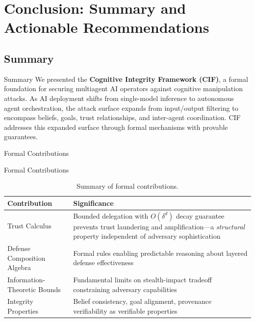 \documentclass[
  ignorenonframetext,
]{beamer}
\author{\texorpdfstring{}{}}
\date{}
\begin{document}
\begin{frame}
\newpage
\end{frame}

\section{Conclusion: Summary and Actionable
Recommendations}\label{conclusion-summary-and-actionable-recommendations}

\subsection{Summary}\label{sec:summary}

\begin{frame}[allowframebreaks]{Summary}
We presented the \textbf{Cognitive Integrity Framework (CIF)}, a formal
foundation for securing multiagent AI operators against cognitive
manipulation attacks. As AI deployment shifts from single-model
inference to autonomous agent orchestration, the attack surface expands
from input/output filtering to encompass beliefs, goals, trust
relationships, and inter-agent coordination. CIF addresses this expanded
surface through formal mechanisms with provable guarantees.
\end{frame}

\begin{frame}[allowframebreaks]{Formal Contributions}
\protect{}\label{formal-contributions}
\end{frame}

\begin{frame}[allowframebreaks]{Formal Contributions}
\begin{table}[htbp]
\centering
\caption{Summary of formal contributions.}
\label{tab:formal-contributions}
\begin{tabular}{@{}lp{8cm}@{}}
\toprule
Contribution & Significance \\
\midrule
Trust Calculus & Bounded delegation with $O(\delta^d)$ decay guarantee prevents trust laundering and amplification---a \textit{structural} property independent of adversary sophistication \\
Defense Composition Algebra & Formal rules enabling predictable reasoning about layered defense effectiveness \\
Information-Theoretic Bounds & Fundamental limits on stealth-impact tradeoff constraining adversary capabilities \\
Integrity Properties & Belief consistency, goal alignment, provenance verifiability as verifiable properties \\
\bottomrule
\end{tabular}
\end{table}
\end{frame}
\end{document}
